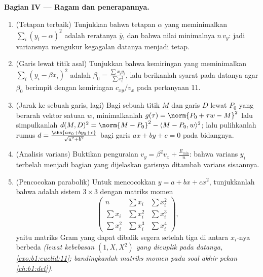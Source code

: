 \begin{problem}
\medskip
\noindent\textbf{Bagian IV --- Ragam dan penerapannya.}
\begin{enumerate}[resume]
  \item (Tetapan terbaik) Tunjukkan bahwa tetapan $\alpha$ yang
        meminimalkan $\sum_i (y_i - \alpha)^2$ adalah reratanya $\bar
        y$, dan bahwa nilai minimalnya $n\,v_y$: jadi variansnya
        mengukur kegagalan datanya menjadi tetap.
  \item (Garis lewat titik asal) Tunjukkan bahwa kemiringan yang meminimalkan
        $\sum_i (y_i - \beta x_i)^2$ adalah $\beta_0 = \frac{\sum
        x_iy_i}{\sum x_i^2}$, lalu berikanlah syarat pada datanya
        agar $\beta_0$ berimpit dengan kemiringan
        $c_{xy}/v_x$ pada pertanyaan 11.
  \item (Jarak ke sebuah garis, lagi) Bagi sebuah titik $M$ dan garis
        $D$ lewat $P_0$ yang berarah vektor satuan $w$,
        minimalkanlah $g(\tau) = \norm{P_0 + \tau w - M}^2$ lalu
        simpulkanlah $d(M, D)^2 = \norm{M - P_0}^2 - \langle M - P_0,
        w\rangle^2$; lalu pulihkanlah rumus $d = \frac{\abs{a x_0 +
        b y_0 + c}}{\sqrt{a^2 + b^2}}$ bagi garis $ax + by + c
        = 0$ pada bidangnya.
  \item (Analisis varians) Buktikan penguraian $v_y =
        \beta^2 v_x + \frac{E_{\min}}n$: bahwa varians
        $y_i$ terbelah menjadi bagian yang dijelaskan garisnya ditambah
        varians sisaannya.
  \item (Pencocokan parabolik) Untuk mencocokkan $y = a + bx + cx^2$, tunjukkanlah bahwa
         adalah sistem $3 \times 3$ dengan
        matriks momen
        \[
        \begin{pmatrix}
        n & \sum x_i & \sum x_i^2\\
        \sum x_i & \sum x_i^2 & \sum x_i^3\\
        \sum x_i^2 & \sum x_i^3 & \sum x_i^4
        \end{pmatrix},
        \]
        yaitu matriks Gram yang dapat dibalik segera setelah tiga di antara
        $x_i$-nya berbeda \emph{(lewat kebebasan $(1, X, X^2)$
        yang dicuplik pada datanya, \cref{exo:b1:euclid:11}; bandingkanlah
        matriks momen pada soal akhir pekan
        \cref{ch:b1:det})}.
\end{enumerate}


\end{problem}

